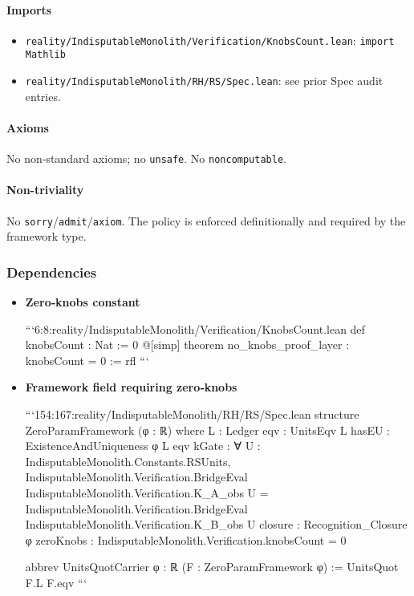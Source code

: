 \documentclass{article}
\newcommand{\FileRef}[1]{\texttt{#1}}
\begin{document}
\paragraph{Imports}
\begin{itemize}[leftmargin=*]
  \item \FileRef{reality/IndisputableMonolith/Verification/KnobsCount.lean}: \texttt{import Mathlib}
  \item \FileRef{reality/IndisputableMonolith/RH/RS/Spec.lean}: see prior Spec audit entries.
\end{itemize}

\paragraph{Axioms}
No non‑standard axioms; no \texttt{unsafe}. No \texttt{noncomputable}.

\paragraph{Non-triviality}
No \texttt{sorry}/\texttt{admit}/\texttt{axiom}. The policy is enforced definitionally and required by the framework type.

\subsubsection{Dependencies}
\begin{itemize}[leftmargin=*]
  \item \textbf{Zero‑knobs constant}

```6:8:reality/IndisputableMonolith/Verification/KnobsCount.lean
def knobsCount : Nat := 0
@[simp] theorem no_knobs_proof_layer : knobsCount = 0 := rfl
```

  \item \textbf{Framework field requiring zero‑knobs}

```154:167:reality/IndisputableMonolith/RH/RS/Spec.lean
structure ZeroParamFramework (φ : ℝ) where
  L    : Ledger
  eqv  : UnitsEqv L
  hasEU : ExistenceAndUniqueness φ L eqv
  kGate : ∀ U : IndisputableMonolith.Constants.RSUnits,
    IndisputableMonolith.Verification.BridgeEval IndisputableMonolith.Verification.K_A_obs U
      = IndisputableMonolith.Verification.BridgeEval IndisputableMonolith.Verification.K_B_obs U
  closure : Recognition_Closure φ
  zeroKnobs : IndisputableMonolith.Verification.knobsCount = 0

abbrev UnitsQuotCarrier {φ : ℝ} (F : ZeroParamFramework φ) := UnitsQuot F.L F.eqv
```
\end{itemize}
\end{document}
